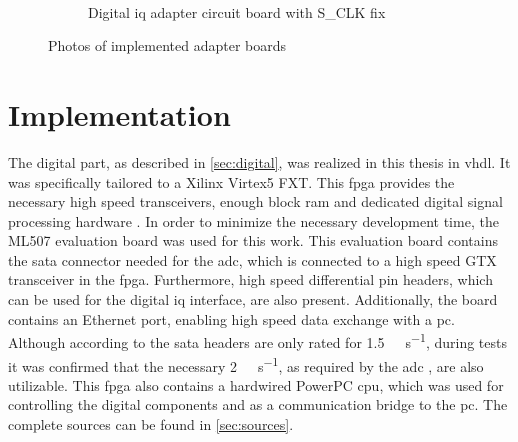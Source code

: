 \documentclass[12pt,a4paper,parskip=full,abstract=true,BCOR=12mm,twoside,open=right]{scrreprt}
\begin{document}
\begin{figure}[htb]
\begin{subfigure}[c]{.45\linewidth}
        \label{fig:adc_adapter_circ}
    \end{subfigure}%
    ~
    \begin{subfigure}[c]{.45\linewidth}
        \centering
        \caption{Digital \gls{iq} adapter circuit board with S\_CLK fix}
        \label{fig:iq_adapter_circ}
    \end{subfigure}
    \caption{Photos of implemented adapter boards}
    \label{fig:adapters}
\end{figure}


\chapter{ Implementation}
\label{chap:fpga}

The digital part, as described in \cref{sec:digital}, was realized in this thesis in \gls{vhdl}.
It was specifically tailored to a Xilinx Virtex5 FXT. This \gls{fpga}
provides the necessary high speed transceivers, enough block \gls{ram}
and dedicated digital signal processing hardware \cite{virtex5}.
In order to minimize the necessary development time, the ML507
evaluation board was used for this work. This evaluation board contains the
\gls{sata} connector needed for the \gls{adc}, which is connected to a high speed GTX transceiver in the \gls{fpga}. Furthermore, high speed differential
pin headers, which can be used for the digital \gls{iq} interface, are also present. Additionally, the board contains an
Ethernet port, enabling high speed data exchange with a \gls{pc}. Although according to
\cite{ml507} the \gls{sata} headers are only rated for \SI{1.5}{\giga\bit\per\second},
during tests it was confirmed that the necessary \SI{2}{\giga\bit\per\second}, as required
by the \gls{adc} \cite{ltc2274}, are also utilizable. This \gls{fpga} also contains a
hardwired PowerPC \gls{cpu}, which was used for controlling the digital components
and as a communication bridge to the \gls{pc}. The complete sources can be found in \cref{sec:sources}.
\end{document}
